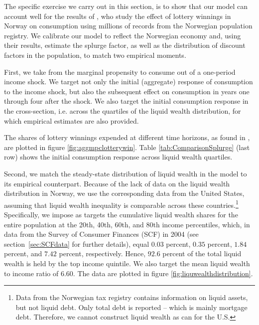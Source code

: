 \documentclass[\econtexRoot/HAFiscal]{subfiles}
\begin{document}
The specific exercise we carry out in this section, is to show that our model can account well for the results of \citet{fagereng_mpc_2021}, who study the effect of lottery winnings in Norway on consumption using millions of records from the Norwegian population registry. We calibrate our model to reflect the Norwegian economy and, using their results, estimate the splurge factor, as well as the distribution of discount factors in the population, to match two empirical moments. 

First, we take from \citet{fagereng_mpc_2021} the marginal propensity to consume out of a one-period income shock. We target not only the initial (aggregate) response of consumption to the income shock, but also the subsequent effect on consumption in years one through four after the shock. We also target the initial consumption response in the cross-section, i.e. across the quartiles of the liquid wealth distribution, for which empirical estimates are also provided. 

The shares of lottery winnings expended at different time horizons, as found in \citet{fagereng_mpc_2021}, are plotted in figure \ref{fig:aggmpclotterywin}. Table \ref{tab:ComparisonSplurge} (last row) shows the initial consumption response across liquid wealth quartiles. 

Second, we match the steady-state distribution of liquid wealth in the model to its empirical counterpart. Because of the lack of data on the liquid wealth distribution in Norway, we use the corresponding data from the United States, assuming that liquid wealth inequality is comparable across these countries.\footnote{Data from the Norwegian tax registry contains information on liquid assets, but not liquid debt. Only total debt is reported -- which is mainly mortgage debt. Therefore, we cannot construct liquid wealth as \citet{kaplan2014model} can for the U.S. \notinsubfile{\label{foot:liqwealth}}} 
Specifically, we impose as targets the cumulative liquid wealth shares for the entire population at the 20th, 40th, 60th, and 80th income percentiles, which, in data from the Survey of Consumer Finances (SCF) in 2004 (see section~\ref{sec:SCFdata} for further details), equal $0.03$ percent, $0.35$ percent, $1.84$ percent, and $7.42$ percent, respectively. Hence, $92.6$ percent of the total liquid wealth is held by the top income quintile. We also target the mean liquid wealth to income ratio of 6.60. The data are plotted in figure \ref{fig:liquwealthdistribution}.
\end{document}
